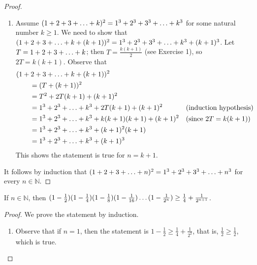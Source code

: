 \documentclass[DIN, pagenumber=false, fontsize=11pt, parskip=half]{scrartcl}
\begin{document}
\begin{problems}
\begin{proof}
\begin{enumerate}
            \item Assume $(1+2+3+\mathellipsis+k)^2 = 1^3+2^3+3^3+\mathellipsis+k^3$ for some natural number $k \geq 1$.
                We need to show that $(1+2+3+\mathellipsis+k+(k+1))^2 = 1^3+2^3+3^3+\mathellipsis+k^3+(k+1)^3$.
                Let $T = 1+2+3+\mathellipsis+k$; then $T = \frac{k(k+1)}{2}$ (see Exercise 1), so $2T = k(k+1)$.
                Observe that
                \begin{align*}
                    \MoveEqLeft (1+2+3+\mathellipsis+k+(k+1))^2\\
                    & = (T + (k+1))^2\\
                    & = T^2 + 2T(k+1) + (k+1)^2\\
                    & = 1^3+2^3+\mathellipsis+k^3 + 2T(k+1) + (k+1)^2 && \text{(induction hypothesis)}\\
                    & = 1^3+2^3+\mathellipsis+k^3 + k(k+1)(k+1) + (k+1)^2 && \text{(since $2T = k(k+1)$)}\\
                    & = 1^3+2^3+\mathellipsis+k^3 + (k+1)^2(k+1)\\
                    & = 1^3+2^3+\mathellipsis+k^3 + (k+1)^3
                \end{align*}
                This shows the statement is true for $n = k+1$.
        \end{enumerate}
        It follows by induction that $(1+2+3+\mathellipsis+n)^2 = 1^3+2^3+3^3+\mathellipsis+n^3$ for every $n \in \mathbb{N}$.
    \end{proof}

    \problem If $n \in \mathbb{N}$, then $(1-\frac{1}{2})(1-\frac{1}{4})(1-\frac{1}{8})(1-\frac{1}{16}) \mathellipsis (1-\frac{1}{2^n}) \geq \frac{1}{4} + \frac{1}{2^{n+1}}$.
    \begin{proof}
        We prove the statement by induction.
        \begin{enumerate}
            \item Observe that if $n=1$, then the statement is $1-\frac{1}{2} \geq \frac{1}{4}+\frac{1}{2^{2}}$, that is, $\frac{1}{2} \geq \frac{1}{2}$, which is true.


\end{enumerate}
\end{proof}
\end{problems}
\end{document}
